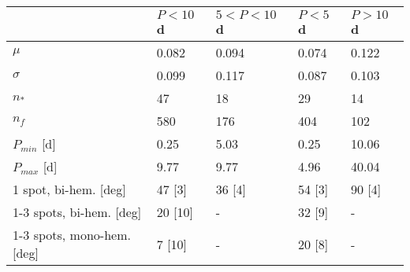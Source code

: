 \begin{tabular}{lllll}
\hline
{} & $P<10\,$d & $5<P<10\,$d & $P<5\,$d & $P>10\,$d \\
\hline
$\mu$                      &     0.082 &       0.094 &    0.074 &     0.122 \\
$\sigma$                   &     0.099 &       0.117 &    0.087 &     0.103 \\
$n_{*}$                    &        47 &          18 &       29 &        14 \\
$n_{f}$                    &       580 &         176 &      404 &       102 \\
$P_{min}$ [d]              &      0.25 &        5.03 &     0.25 &     10.06 \\
$P_{max}$ [d]              &      9.77 &        9.77 &     4.96 &     40.04 \\
1 spot, bi-hem. [deg]     &    47 [3] &      36 [4] &   54 [3] &    90 [4] \\
1-3 spots, bi-hem. [deg]   &   20 [10] &           - &   32 [9] &         - \\
1-3 spots, mono-hem. [deg] &    7 [10] &           - &   20 [8] &         - \\
\hline
\end{tabular}
